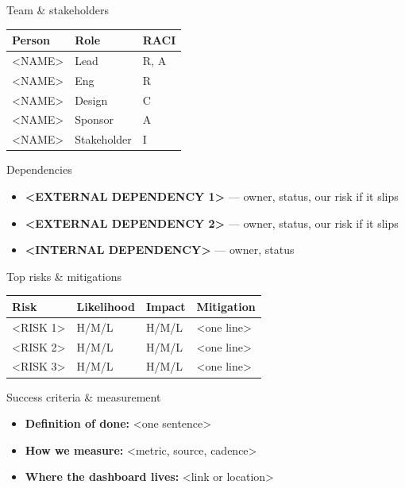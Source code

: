 \documentclass[aspectratio=169,12pt]{beamer}
\begin{document}
\begin{frame}{Team \& stakeholders}
  \begin{tabular}{lll}
    \toprule
    Person & Role & RACI \\
    \midrule
    <NAME> & Lead & R, A \\
    <NAME> & Eng & R \\
    <NAME> & Design & C \\
    <NAME> & Sponsor & A \\
    <NAME> & Stakeholder & I \\
    \bottomrule
  \end{tabular}
\end{frame}

\begin{frame}{Dependencies}
  \begin{itemize}
    \item \textbf{<EXTERNAL DEPENDENCY 1>} --- owner, status, our risk if it slips
    \item \textbf{<EXTERNAL DEPENDENCY 2>} --- owner, status, our risk if it slips
    \item \textbf{<INTERNAL DEPENDENCY>} --- owner, status
  \end{itemize}
\end{frame}

\begin{frame}{Top risks \& mitigations}
  \begin{tabular}{llll}
    \toprule
    Risk & Likelihood & Impact & Mitigation \\
    \midrule
    <RISK 1> & H/M/L & H/M/L & <one line> \\
    <RISK 2> & H/M/L & H/M/L & <one line> \\
    <RISK 3> & H/M/L & H/M/L & <one line> \\
    \bottomrule
  \end{tabular}
\end{frame}

\begin{frame}{Success criteria \& measurement}
  \begin{itemize}
    \item \textbf{Definition of done:} <one sentence>
    \item \textbf{How we measure:} <metric, source, cadence>
    \item \textbf{Where the dashboard lives:} <link or location>
  \end{itemize}
\end{frame}
\end{document}
